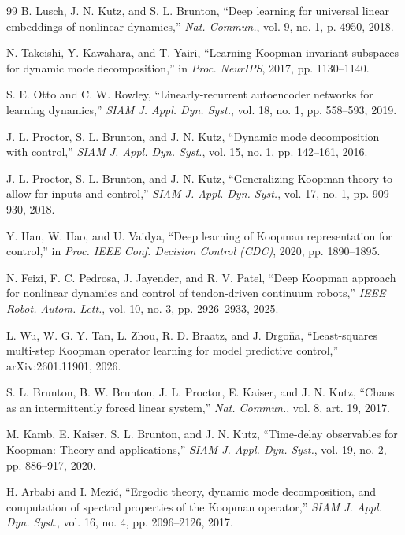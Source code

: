 \documentclass[journal]{IEEEtran}
\begin{document}
\begin{thebibliography}{99}
B. Lusch, J. N. Kutz, and S. L. Brunton, ``Deep learning for universal linear embeddings of nonlinear dynamics,'' \emph{Nat. Commun.}, vol. 9, no. 1, p. 4950, 2018.

N. Takeishi, Y. Kawahara, and T. Yairi, ``Learning Koopman invariant subspaces for dynamic mode decomposition,'' in \emph{Proc. NeurIPS}, 2017, pp. 1130--1140.

S. E. Otto and C. W. Rowley, ``Linearly-recurrent autoencoder networks for learning dynamics,'' \emph{SIAM J. Appl. Dyn. Syst.}, vol. 18, no. 1, pp. 558--593, 2019.

J. L. Proctor, S. L. Brunton, and J. N. Kutz, ``Dynamic mode decomposition with control,'' \emph{SIAM J. Appl. Dyn. Syst.}, vol. 15, no. 1, pp. 142--161, 2016.

J. L. Proctor, S. L. Brunton, and J. N. Kutz, ``Generalizing Koopman theory to allow for inputs and control,'' \emph{SIAM J. Appl. Dyn. Syst.}, vol. 17, no. 1, pp. 909--930, 2018.

Y. Han, W. Hao, and U. Vaidya, ``Deep learning of Koopman representation for control,'' in \emph{Proc. IEEE Conf. Decision Control (CDC)}, 2020, pp. 1890--1895.

N. Feizi, F. C. Pedrosa, J. Jayender, and R. V. Patel, ``Deep Koopman approach for nonlinear dynamics and control of tendon-driven continuum robots,'' \emph{IEEE Robot. Autom. Lett.}, vol. 10, no. 3, pp. 2926--2933, 2025.

L. Wu, W. G. Y. Tan, L. Zhou, R. D. Braatz, and J. Drgo\v{n}a, ``Least-squares multi-step Koopman operator learning for model predictive control,'' arXiv:2601.11901, 2026.

S. L. Brunton, B. W. Brunton, J. L. Proctor, E. Kaiser, and J. N. Kutz, ``Chaos as an intermittently forced linear system,'' \emph{Nat. Commun.}, vol. 8, art. 19, 2017.

M. Kamb, E. Kaiser, S. L. Brunton, and J. N. Kutz, ``Time-delay observables for Koopman: Theory and applications,'' \emph{SIAM J. Appl. Dyn. Syst.}, vol. 19, no. 2, pp. 886--917, 2020.

H. Arbabi and I. Mezi\'c, ``Ergodic theory, dynamic mode decomposition, and computation of spectral properties of the Koopman operator,'' \emph{SIAM J. Appl. Dyn. Syst.}, vol. 16, no. 4, pp. 2096--2126, 2017.


\end{thebibliography}
\end{document}
